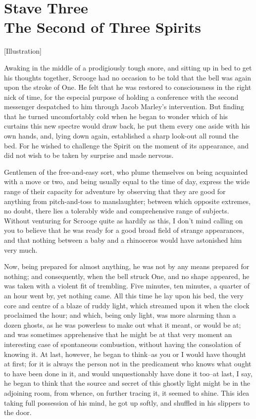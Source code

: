 \chapter{Stave Three\\The Second of Three Spirits}
[Illustration]

Awaking in the middle of a prodigiously tough snore, and sitting up in
bed to get his thoughts together, Scrooge had no occasion to be told
that the bell was again upon the stroke of One. He felt that he was
restored to consciousness in the right nick of time, for the especial
purpose of holding a conference with the second messenger despatched to
him through Jacob Marley's intervention. But finding that he turned
uncomfortably cold when he began to wonder which of his curtains this
new spectre would draw back, he put them every one aside with his own
hands, and, lying down again, established a sharp look-out all round the
bed. For he wished to challenge the Spirit on the moment of its
appearance, and did not wish to be taken by surprise and made nervous.

Gentlemen of the free-and-easy sort, who plume themselves on being
acquainted with a move or two, and being usually equal to the time of
day, express the wide range of their capacity for adventure by observing
that they are good for anything from pitch-and-toss to manslaughter;
between which opposite extremes, no doubt, there lies a tolerably wide
and comprehensive range of subjects. Without venturing for Scrooge quite
as hardily as this, I don't mind calling on you to believe that he was
ready for a good broad field of strange appearances, and that nothing
between a baby and a rhinoceros would have astonished him very much.

Now, being prepared for almost anything, he was not by any means
prepared for nothing; and consequently, when the bell struck One, and no
shape appeared, he was taken with a violent fit of trembling. Five
minutes, ten minutes, a quarter of an hour went by, yet nothing came.
All this time he lay upon his bed, the very core and centre of a blaze
of ruddy light, which streamed upon it when the clock proclaimed the
hour; and which, being only light, was more alarming than a dozen
ghosts, as he was powerless to make out what it meant, or would be at;
and was sometimes apprehensive that he might be at that very moment an
interesting case of spontaneous combustion, without having the
consolation of knowing it. At last, however, he began to think--as you
or I would have thought at first; for it is always the person not in the
predicament who knows what ought to have been done in it, and would
unquestionably have done it too--at last, I say, he began to think that
the source and secret of this ghostly light might be in the adjoining
room, from whence, on further tracing it, it seemed to shine. This idea
taking full possession of his mind, he got up softly, and shuffled in
his slippers to the door.

